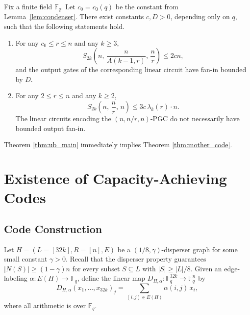 \documentclass[11pt]{article}
\theoremstyle{named}
\begin{document}
\begin{theorem}
\label{thm:ub_main}
Fix a finite field $\mathbb{F}_q$. Let $c_0 = c_0(q)$ be the constant 
from Lemma~\ref{lem:condenser}. There exist constants $c, D > 0$, 
depending only on $q$, such that the following statements hold.
\begin{enumerate}
    \item For any $c_0 \le r \le n$ and any $k \ge 3$,
    \begin{equation}
    \label{equ:d2k_first}
    S_{2k}\!\left(n,\, \frac{n}{A(k-1,r)},\, \frac{n}{r}\right) \le 2cn,
    \end{equation}
    and the output gates of the corresponding linear circuit have fan-in 
    bounded by $D$.
    \item For any $2 \le r \le n$ and any $k \ge 2$,
    \begin{equation}
    \label{equ:d2k_second}
    S_{2k}\!\left(n,\, \frac{n}{r},\, n\right) \le 3c\,\lambda_k(r) \cdot n.
    \end{equation}
    The linear circuits encoding the $(n, n/r, n)$-PGC do not necessarily 
    have bounded output fan-in.
\end{enumerate}
\end{theorem}

Theorem \ref{thm:ub_main} immediately implies Theorem \ref{thm:mother_code}.



\section{Existence of Capacity-Achieving Codes}


\subsection{Code Construction}
\label{section:code_construction}

Let $H = (L=[32k], R = [n], E)$ be a $(1/8, \gamma)$-disperser graph for some small constant $\gamma > 0$. Recall that the disperser property guarantees $|N(S)| \ge (1-\gamma)n$ for every subset $S \subseteq L$ with $|S| \ge |L|/8$. Given an edge-labeling $\alpha: E(H) \to \mathbb{F}_q$, define the linear map $D_{H,\alpha}: \mathbb{F}_q^{32k} \to \mathbb{F}_q^n$ by
\begin{equation}
    D_{H, \alpha}(x_1, \dots, x_{32k})_j = \sum_{(i,j) \in E(H)} \alpha(i,j)\, x_i,
\end{equation}
where all arithmetic is over $\mathbb{F}_q$.
\end{document}
